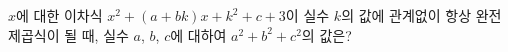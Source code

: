 $x$에 대한 이차식 $x^2+(a+bk)x+k^2+c+3$이 실수 $k$의 값에 관계없이 항상 완전제곱식이 될 때, 실수 $a$, $b$, $c$에 대하여 $a^2+b^2+c^2$의 값은?
